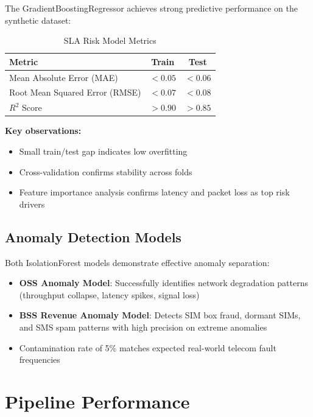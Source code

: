 The GradientBoostingRegressor achieves strong predictive performance on the synthetic dataset:

\begin{table}[H]
\centering
\caption{SLA Risk Model Metrics}
\label{tab:sla-metrics}
\begin{tabular}{@{}lcc@{}}
\toprule
\textbf{Metric} & \textbf{Train} & \textbf{Test} \\
\midrule
Mean Absolute Error (MAE) & $< 0.05$ & $< 0.06$ \\
Root Mean Squared Error (RMSE) & $< 0.07$ & $< 0.08$ \\
$R^2$ Score & $> 0.90$ & $> 0.85$ \\
\bottomrule
\end{tabular}
\end{table}

\textbf{Key observations:}
\begin{itemize}
    \item Small train/test gap indicates low overfitting
    \item Cross-validation confirms stability across folds
    \item Feature importance analysis confirms latency and packet loss as top risk drivers
\end{itemize}

\subsection{Anomaly Detection Models}

Both IsolationForest models demonstrate effective anomaly separation:

\begin{itemize}
    \item \textbf{OSS Anomaly Model}: Successfully identifies network degradation patterns (throughput collapse, latency spikes, signal loss)
    \item \textbf{BSS Revenue Anomaly Model}: Detects SIM box fraud, dormant SIMs, and SMS spam patterns with high precision on extreme anomalies
    \item Contamination rate of 5\% matches expected real-world telecom fault frequencies
\end{itemize}

\section{Pipeline Performance}

